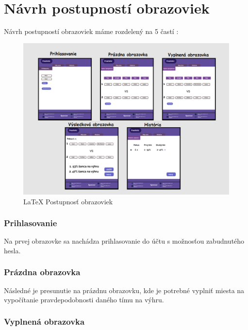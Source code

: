 \section*{Návrh postupností obrazoviek}

Návrh postupností obrazoviek máme rozdelený na 5 častí :



\begin{figure}[h!]
	
	\includegraphics[width=.9\textwidth]{figures/postupnost}
	
	\centering
	
	\caption{\LaTeX{} Postupnosť obrazoviek \label{jednanula}}
	
\end{figure}



\subsubsection{Prihlasovanie}

Na prvej obrazovke sa nachádza prihlasovanie do účtu s možnosťou zabudnutého hesla.

\subsubsection{Prázdna obrazovka}

Následné je presunutie na prázdnu obrazovku, kde je potrebné vyplniť miesta na vypočítanie pravdepodobnosti daného tímu na výhru.

\subsubsection{Vyplnená obrazovka}

